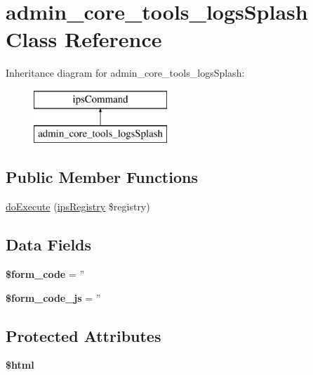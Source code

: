\hypertarget{classadmin__core__tools__logs_splash}{\section{admin\-\_\-core\-\_\-tools\-\_\-logs\-Splash Class Reference}
\label{classadmin__core__tools__logs_splash}
}
Inheritance diagram for admin\-\_\-core\-\_\-tools\-\_\-logs\-Splash\-:\begin{figure}[H]
\begin{center}
\leavevmode
\includegraphics[height=2.000000cm]{classadmin__core__tools__logs_splash}
\end{center}
\end{figure}
\subsection*{Public Member Functions}
\begin{DoxyCompactItemize}
\item 
\hyperlink{classadmin__core__tools__logs_splash_afbc4e912a0604b94d47d66744c64d8ba}{do\-Execute} (\hyperlink{classips_registry}{ips\-Registry} \$registry)
\end{DoxyCompactItemize}
\subsection*{Data Fields}
\begin{DoxyCompactItemize}
\item 
\hypertarget{classadmin__core__tools__logs_splash_af28aee726fa3eb6c355d08a2ab655e03}{{\bfseries \$form\-\_\-code} = ''}\label{classadmin__core__tools__logs_splash_af28aee726fa3eb6c355d08a2ab655e03}

\item 
\hypertarget{classadmin__core__tools__logs_splash_ac68fe8a02a2efd63c3271179f4b4fbb7}{{\bfseries \$form\-\_\-code\-\_\-js} = ''}\label{classadmin__core__tools__logs_splash_ac68fe8a02a2efd63c3271179f4b4fbb7}

\end{DoxyCompactItemize}
\subsection*{Protected Attributes}
\begin{DoxyCompactItemize}
\item 
\hypertarget{classadmin__core__tools__logs_splash_a6f96e7fc92441776c9d1cd3386663b40}{{\bfseries \$html}}\label{classadmin__core__tools__logs_splash_a6f96e7fc92441776c9d1cd3386663b40}

\end{DoxyCompactItemize}


